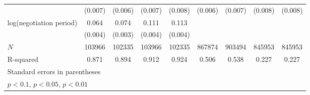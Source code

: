 {\begin{adjustbox}{max width=\textwidth}
\begin{tabular}{l*{8}{c}}
            &     (0.007)         &     (0.006)         &     (0.007)         &     (0.008)         &     (0.006)         &     (0.007)         &     (0.008)         &     (0.008)         \\
\addlinespace
log(negotiation period)&       0.064\sym{***}&       0.074\sym{***}&       0.111\sym{***}&       0.113\sym{***}&                     &                     &                     &                     \\
            &     (0.004)         &     (0.003)         &     (0.004)         &     (0.004)         &                     &                     &                     &                     \\
\midrule
\(N\)       &      103966         &      102335         &      103966         &      102335         &      867874         &      903494         &      845953         &      845953         \\
R-squared   &       0.871         &       0.894         &       0.912         &       0.924         &       0.506         &       0.538         &       0.227         &       0.227         \\
\bottomrule
\multicolumn{9}{l}{\footnotesize Standard errors in parentheses}\\
\multicolumn{9}{l}{\footnotesize \sym{*} \(p<0.1\), \sym{**} \(p<0.05\), \sym{***} \(p<0.01\)}\\
\end{tabular}
\end{adjustbox}
}
